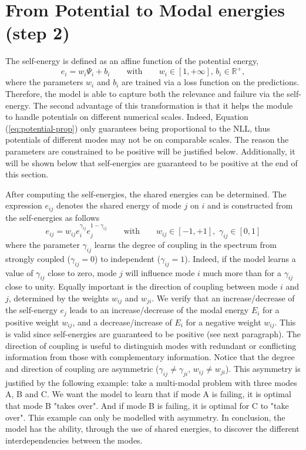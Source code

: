 \section{From Potential to Modal energies (step 2)}\label{sec:step2}
The self-energy is defined as an affine function of the potential energy,
\begin{equation}
e_i = w_i\Psi_i + b_i \qquad \text{with} \qquad w_i \in [1, +\infty],\, b_i \in \mathbb{R}^+,
\label{eq:self-energy}
\end{equation}
where the parameters $w_i$ and $b_i$ are trained via a loss function on the predictions. Therefore, the model is able to capture both the relevance and failure via the self-energy. The second advantage of this transformation is that it helps the module to handle potentials on different numerical scales. Indeed, Equation (\ref{eq:potential-prop}) only guarantees being proportional to the NLL, thus potentials of different modes may not be on comparable scales. The reason the parameters are constrained to be positive will be justified below. Additionally, it will be shown below that self-energies are guaranteed to be positive at the end of this section.

After computing the self-energies, the shared energies can be determined. The expression $e_{ij}$ denotes the shared energy of mode $j$ on $i$ and is constructed from the self-energies as follows
\begin{equation}
e_{ij} = w_{ij}e_i^{\gamma_{ij}}e_j^{1-\gamma_{ij}} \qquad \text{with} \qquad w_{ij} \in [-1,+1],\,\, \gamma_{ij} \in [0,1]
\label{eq:shared-energy}
\end{equation}
where the parameter $\gamma_{ij}$ learns the degree of coupling in the spectrum from strongly coupled ($\gamma_{ij}=0$) to independent ($\gamma_{ij} = 1$). Indeed, if the model learns a value of $\gamma_{ij}$ close to zero, mode $j$ will influence mode $i$ much more than for a $\gamma_{ij}$ close to unity. Equally important is the direction of coupling between mode $i$ and $j$, determined by the weights $w_{ij}$ and $w_{ji}$. We verify that an increase/decrease of the self-energy $e_j$ leads to an increase/decrease of the modal energy $E_i$ for a positive weight $w_{ij}$, and a decrease/increase of $E_i$ for a negative weight $w_{ij}$. This is valid since self-energies are guaranteed to be positive (see next paragraph). The direction of coupling is useful to distinguish modes with redundant or conflicting information from those with complementary information. Notice that the degree and direction of coupling are asymmetric ($\gamma_{ij} \neq \gamma_{ji},\, w_{ij} \neq w_{ji}$). This asymmetry is justified by the following example: take a multi-modal problem with three modes A, B and C. We want the model to learn that if mode A is failing, it is optimal that mode B "takes over". And if mode B is failing, it is optimal for C to "take over". This example can only be modelled with asymmetry. In conclusion, the model has the ability, through the use of shared energies, to discover the different interdependencies between the modes.

